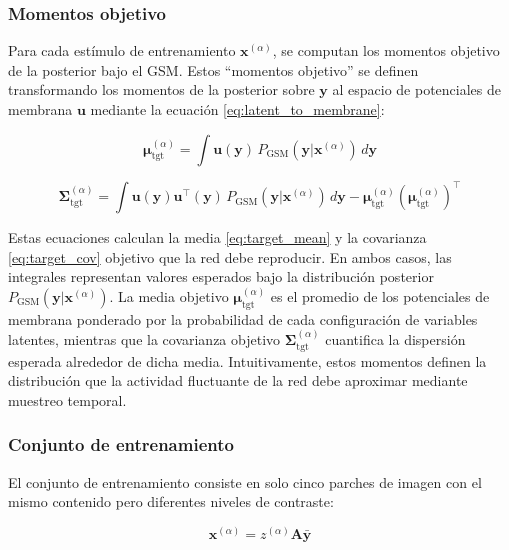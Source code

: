 \subsubsection{Momentos objetivo}

Para cada estímulo de entrenamiento $\mathbf{x}^{(\alpha)}$, se computan los momentos objetivo de la posterior bajo el \acrshort{GSM}. Estos ``momentos objetivo'' se definen transformando los momentos de la posterior sobre $\mathbf{y}$ al espacio de potenciales de membrana $\mathbf{u}$ mediante la ecuación \ref{eq:latent_to_membrane}:

\begin{equation}
\boldsymbol{\mu}_{\text{tgt}}^{(\alpha)} = \int \mathbf{u}(\mathbf{y}) \, P_{\text{GSM}}(\mathbf{y}|\mathbf{x}^{(\alpha)}) \, d\mathbf{y}
\label{eq:target_mean}
\end{equation}

\begin{equation}
\boldsymbol{\Sigma}_{\text{tgt}}^{(\alpha)} = \int \mathbf{u}(\mathbf{y}) \mathbf{u}^\top(\mathbf{y}) \, P_{\text{GSM}}(\mathbf{y}|\mathbf{x}^{(\alpha)}) \, d\mathbf{y} - \boldsymbol{\mu}_{\text{tgt}}^{(\alpha)} (\boldsymbol{\mu}_{\text{tgt}}^{(\alpha)})^\top
\label{eq:target_cov}
\end{equation}

Estas ecuaciones calculan la media \eqref{eq:target_mean} y la covarianza \eqref{eq:target_cov} objetivo que la red debe reproducir. En ambos casos, las integrales representan valores esperados bajo la distribución posterior $P_{\text{GSM}}(\mathbf{y}|\mathbf{x}^{(\alpha)})$.
La media objetivo $\boldsymbol{\mu}_{\text{tgt}}^{(\alpha)}$ es el promedio de los potenciales de membrana ponderado por la probabilidad de cada configuración de variables latentes, mientras que la covarianza objetivo $\boldsymbol{\Sigma}_{\text{tgt}}^{(\alpha)}$ cuantifica la dispersión esperada alrededor de dicha media. Intuitivamente, estos momentos definen la distribución que la actividad fluctuante de la red debe aproximar mediante muestreo temporal.

\subsubsection{Conjunto de entrenamiento}

El conjunto de entrenamiento consiste en solo cinco parches de imagen con el mismo contenido pero diferentes niveles de contraste:

\begin{equation}
\mathbf{x}^{(\alpha)} = z^{(\alpha)} \mathbf{A} \bar{\mathbf{y}}
\label{eq:training_stimuli}
\end{equation}

